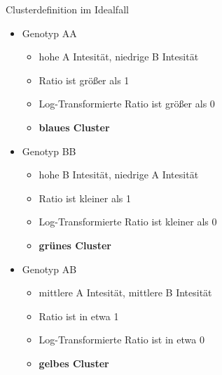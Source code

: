\documentclass{beamer}
\begin{document}
\begin{frame}{Clusterdefinition im Idealfall}
    \begin{itemize}
        \item Genotyp AA
        \begin{itemize}
            \item hohe A Intesität, niedrige B Intesität 
            \item Ratio ist größer als 1
            \item Log-Transformierte Ratio ist größer als 0
            \item \textbf{blaues Cluster} 
        \end{itemize}
        \item Genotyp BB
        \begin{itemize}
            \item hohe B Intesität, niedrige A Intesität 
            \item Ratio ist kleiner als 1
            \item Log-Transformierte Ratio ist kleiner als 0
            \item \textbf{grünes Cluster} 
        \end{itemize}
        \item Genotyp AB
        \begin{itemize}
            \item mittlere A Intesität, mittlere B Intesität 
            \item Ratio ist in etwa 1
            \item Log-Transformierte Ratio ist in etwa 0
            \item \textbf{gelbes Cluster} 
        \end{itemize}
    \end{itemize}
    
\end{frame}
\end{document}
